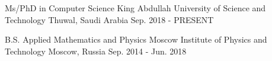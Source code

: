 


\begin{cventries}


\cventry
{Ms/PhD in Computer Science } %
{King Abdullah University of Science and Technology} %
{Thuwal, Saudi Arabia} %
{Sep. 2018 - PRESENT} %
{
}

\cventry
{B.S. Applied Mathematics and Physics} %
{Moscow Institute of Physics and Technology} %
{Moscow, Russia} %
{Sep. 2014 - Jun. 2018} %
{ %
}


\end{cventries}